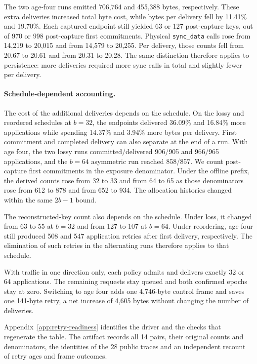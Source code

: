 \documentclass[pdflatex]{sn-jnl}
\theoremstyle{thmstyleone}
\theoremstyle{thmstylethree}
\theoremstyle{thmstyletwo}
\begin{document}
The two age-four runs emitted 706,764 and 455,388 bytes, respectively.
These extra deliveries increased total byte cost, while bytes per delivery
fell by 11.41\% and 19.70\%. Each captured endpoint still yielded 63 or
127 post-capture keys, out of 970 or 998 post-capture
first commitments. Physical \texttt{sync\_data} calls rose from 14,219
to 20,015 and from 14,579 to 20,255. Per delivery, those counts fell
from 20.67 to 20.61 and from 20.31 to 20.28. The same distinction
therefore applies to persistence: more deliveries required more
sync calls in total and slightly fewer per delivery.

\paragraph{Schedule-dependent accounting.}
The cost of the additional deliveries depends on the schedule. On the lossy
and reordered schedules at $b=32$, the endpoints delivered 36.09\% and
16.84\% more applications while spending 14.37\% and 3.94\% more bytes
per delivery. First commitment and completed delivery can also separate
at the end of a run. With age four, the two lossy runs committed/delivered
906/905 and 966/965 applications, and the $b=64$ asymmetric run reached
858/857. We count post-capture first commitments in the exposure
denominator. Under the offline prefix, the derived counts rose from
32 to 33 and from 64 to 65 as those denominators rose from 612 to 878
and from 652 to 934. The allocation histories changed within the same
$2b-1$ bound.

The reconstructed-key count also depends on the schedule. Under loss,
it changed from 63 to 55 at $b=32$ and from 127 to 107 at $b=64$.
Under reordering, age four still produced 508 and 547 application retries
after first delivery, respectively. The elimination of such retries in
the alternating runs therefore applies to that schedule.

With traffic in one direction only, each policy admits and delivers
exactly 32 or 64 applications. The remaining requests stay queued and
both confirmed epochs stay at zero. Switching to age four adds one
4,746-byte control frame and saves one 141-byte retry, a net increase
of 4,605 bytes without changing the number of deliveries.

Appendix~\ref{app:retry-readiness} identifies the driver and the checks
that regenerate the table. The artifact records all 14 pairs, their
original counts and denominators, the identities of the 28 public traces
and an independent recount of retry ages and frame outcomes.
\end{document}

